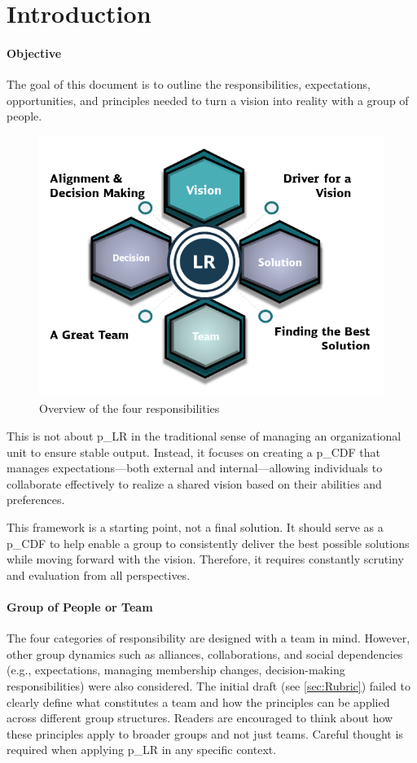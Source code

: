 \section{Introduction}

\paragraph{Objective}
The goal of this document is to outline the responsibilities, expectations, opportunities, and principles needed to turn a vision into reality with a group of people.

\begin{figure}[H]
	\centering
	\includegraphics[scale=0.9]{attachment/chapter_OWN/Rubric_Leadership.png}
	\caption{Overview of the four responsibilities}
\end{figure}

This is not about \gls{p_LR} in the traditional sense of managing an organizational unit to ensure stable output. Instead, it focuses on creating a \gls{p_CDF} that manages expectations—both external and internal—allowing individuals to collaborate effectively to realize a shared vision based on their abilities and preferences.

This framework is a starting point, not a final solution. It should serve as a \gls{p_CDF} to help enable a group to consistently deliver the best possible solutions while moving forward with the vision. Therefore, it requires constantly scrutiny and evaluation from all perspectives.


\paragraph{Group of People or Team}
The four categories of responsibility are designed with a team in mind. However, other group dynamics such as alliances, collaborations, and social dependencies (e.g., expectations, managing membership changes, decision-making responsibilities) were also considered. The initial draft (see \ref{sec:Rubric}) failed to clearly define what constitutes a team and how the principles can be applied across different group structures. Readers are encouraged to think about how these principles apply to broader groups and not just teams. Careful thought is required when applying \gls{p_LR} in any specific context.

